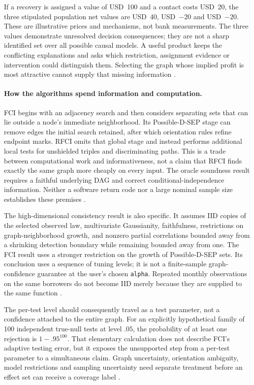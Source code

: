 If a recovery is assigned a value of USD~100 and a contact costs USD~20, the
three stipulated population net values are USD~40, USD~$-20$ and USD~$-20$.
These are illustrative prices and mechanisms, not bank measurements. The
three values demonstrate unresolved decision consequences; they are not a
sharp identified set over all possible causal models. A useful product keeps
the conflicting explanations and asks which restriction, assignment evidence
or intervention could distinguish them. Selecting the graph whose implied
profit is most attractive cannot supply that missing information
\citep{exec13_latentr_exact}.

\paragraph{How the algorithms spend information and computation.}
FCI begins with an adjacency search and then considers separating sets that
can lie outside a node's immediate neighborhood. Its Possible-D-SEP stage
can remove edges the initial search retained, after which orientation rules
refine endpoint marks. RFCI omits that global stage and instead performs
additional local tests for unshielded triples and discriminating paths.
This is a trade between computational work and informativeness, not a claim
that RFCI finds exactly the same graph more cheaply on every input. The
oracle soundness result requires a faithful underlying DAG and correct
conditional-independence information. Neither a software return code nor a
large nominal sample size establishes these premises
\citep{exec13_latentr_colombo2012,exec13_latentr_primary}.

The high-dimensional consistency result is also specific. It assumes IID
copies of the selected observed law, multivariate Gaussianity, faithfulness,
restrictions on graph-neighborhood growth, and nonzero partial correlations
bounded away from a shrinking detection boundary while remaining bounded
away from one. The FCI result uses a stronger restriction on the growth of
Possible-D-SEP sets. Its conclusion uses a sequence of tuning levels; it is
not a finite-sample graph-confidence guarantee at the user's chosen
\texttt{alpha}. Repeated monthly observations on the same borrowers do not
become IID merely because they are supplied to the same function
\citep{exec13_latentr_colombo2012}.

The per-test level should consequently travel as a test parameter, not a
confidence attached to the entire graph. For an explicitly hypothetical
family of 100 independent true-null tests at level $.05$, the probability
of at least one rejection is $1-.95^{100}$. That elementary calculation
does not describe FCI's adaptive testing error, but it exposes the unsupported
step from a per-test parameter to a simultaneous claim. Graph uncertainty,
orientation ambiguity, model restrictions and sampling uncertainty need
separate treatment before an effect set can receive a coverage label
\citep{exec13_latentr_exact,exec13_latentr_colombo2012}.

